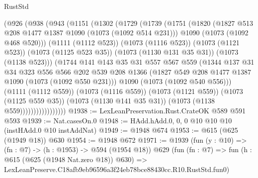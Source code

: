 \begin{lexlean}{RustStd}
\begin{coremodule}
                  (@926
                    (@938
                      (@943
                        (@1151
                          (@1302
                            (@1729
                              (@1739
                                (@1751
                                  (@1820
                                    (@1827 @513 @208 @1477 @1387 @1090 (@1073 (@1092 @514 @231)))
                                    @1090
                                    (@1073 (@1092 @468 @520)))
                                  (@1111 (@1112 @523))
                                  (@1073 (@1116 @523))
                                  (@1073 (@1121 @523))
                                  (@1073 (@1125 @523 @35))
                                  (@1073 (@1130 @131 @35 @31))
                                  (@1073 (@1138 @523)))
                                (@1744
                                  @141
                                  @143
                                  @35
                                  @31
                                  @557
                                  @567
                                  @559
                                  (@1344
                                    @137
                                    @31
                                    @34
                                    @323
                                    @556
                                    @566
                                    @202
                                    @539
                                    @208
                                    @1366
                                    (@1827 @549 @208 @1477 @1387 @1090 (@1073 (@1092 @550 @231)))
                                    @1090
                                    (@1073 (@1092 @540 @556)))
                                  (@1111 (@1112 @559))
                                  (@1073 (@1116 @559))
                                  (@1073 (@1121 @559))
                                  (@1073 (@1125 @559 @35))
                                  (@1073 (@1130 @141 @35 @31))
                                  (@1073 (@1138 @559)))))))))))))))))
@1938 := LexLeanPreservation.Rust.CrateOK @589 @591 @593
@1939 := Nat.casesOn.{0}
@1948 := HAdd.hAdd.{0, 0, 0} @10 @10 @10 (instHAdd.{0} @10 instAddNat)
@1949 := @1948 @674
@1953 := @615 (@625 (@1949 @18)) @630
@1954 := @1948 @672
@1971 := @1939
    (fun (y : @10) => (fn : @7) -> (h : @1953) -> @594 (@1954 @18))
    @629
    (fun (fn : @7) =>
    fun (h : @615 (@625 (@1948 Nat.zero @18)) @630) =>
    LexLeanPreserve.C18afb9eb96596a3f24eb78bce88430cc.R10.RustStd.fun0)

\end{coremodule}
\end{lexlean}
